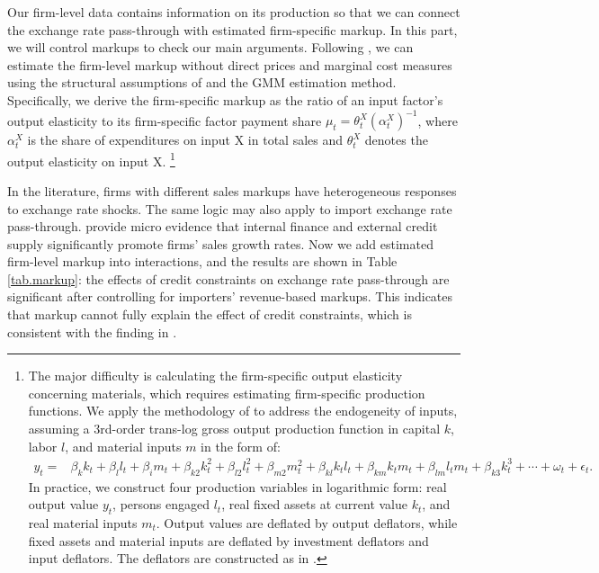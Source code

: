 \documentclass[12pt]{article}
\begin{document}
Our firm-level data contains information on its production so that we can connect the exchange rate pass-through with estimated firm-specific markup. In this part, we will control markups to check our main arguments. Following \cite{bkl2021}, we can estimate the firm-level markup without direct prices and marginal cost measures using the structural assumptions of \cite{dlw2012} and the GMM estimation method. Specifically, we derive the firm-specific markup as the ratio of an input factor's output elasticity to its firm-specific factor payment share $\mu_{t}=\theta_{t}^{X}\left(\alpha_{t}^{X}\right)^{-1}$, where $\alpha_{t}^{X}$ is the share of expenditures on input X in total sales and $\theta^X_t$ denotes the output elasticity on input X. \footnote{The major difficulty is calculating the firm-specific output elasticity concerning materials, which requires estimating firm-specific production functions. We apply the methodology of \cite{acf2015} to address the endogeneity of inputs, assuming a 3rd-order trans-log gross output production function in capital $k$, labor $l$, and material inputs $m$ in the form of:
$$
\begin{aligned}
	y_{t}= &\beta_{k} k_{t}+\beta_{l} l_{t}+\beta_{i} m_{t}+\beta_{k 2} k_{t}^{2}+\beta_{l 2} l_{t}^{2}+\beta_{m 2} m_{t}^{2}+\beta_{k l} k_{ t} l_{t}+\beta_{k m} k_{t} m_{t}+\beta_{l m} l_{t} m_{t}+\beta_{k 3} k_{t}^{3}+\cdots+\omega_{t}+\epsilon_{t}.
\end{aligned}
$$
In practice, we construct four production variables in logarithmic form: real output value $y_t$, persons engaged $l_t$, real fixed assets at current value $k_t$, and real material inputs $m_t$. Output values are deflated by output deflators, while fixed assets and material inputs are deflated by investment deflators and input deflators. The deflators are constructed as in \cite{brandt2012}.}

In the literature, firms with different sales markups have heterogeneous responses to exchange rate shocks. The same logic may also apply to import exchange rate pass-through. \cite{llz2018} provide micro evidence that internal finance and external credit supply significantly promote firms' sales growth rates. Now we add estimated firm-level markup into interactions, and the results are shown in Table \ref{tab.markup}: the effects of credit constraints on exchange rate pass-through are significant after controlling for importers' revenue-based markups. This indicates that markup cannot fully explain the effect of credit constraints, which is consistent with the finding in \cite{xu-guo2021}.
\end{document}
